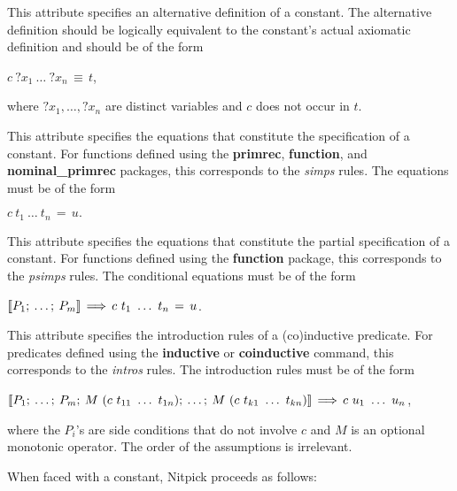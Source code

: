\documentclass[a4paper,12pt]{article}
\begin{document}
\begin{itemize}

\nopagebreak
This attribute specifies an alternative definition of a constant. The
alternative definition should be logically equivalent to the constant's actual
axiomatic definition and should be of the form

\qquad $c~{?}x_1~\ldots~{?}x_n \,\equiv\, t$,

where ${?}x_1, \ldots, {?}x_n$ are distinct variables and $c$ does not occur in
$t$.


\nopagebreak
This attribute specifies the equations that constitute the specification of a
constant. For functions defined using the \textbf{primrec}, \textbf{function},
and \textbf{nominal\_\allowbreak primrec} packages, this corresponds to the
\textit{simps} rules. The equations must be of the form

\qquad $c~t_1~\ldots\ t_n \,=\, u.$


\nopagebreak
This attribute specifies the equations that constitute the partial specification
of a constant. For functions defined using the \textbf{function} package, this
corresponds to the \textit{psimps} rules. The conditional equations must be of
the form

\qquad $\mathopen{[\![} P_1;\> \ldots;\> P_m\mathclose{]\!]} \,\Longrightarrow\, c\ t_1\ \ldots\ t_n \,=\, u$.


\nopagebreak
This attribute specifies the introduction rules of a (co)in\-duc\-tive predicate.
For predicates defined using the \textbf{inductive} or \textbf{coinductive}
command, this corresponds to the \textit{intros} rules. The introduction rules
must be of the form

\qquad $\lbrakk P_1;\> \ldots;\> P_m;\> M~(c\ t_{11}\ \ldots\ t_{1n});\>
\ldots;\> M~(c\ t_{k1}\ \ldots\ t_{kn})\rbrakk \,\Longrightarrow\, c\ u_1\
\ldots\ u_n$,

where the $P_i$'s are side conditions that do not involve $c$ and $M$ is an
optional monotonic operator. The order of the assumptions is irrelevant.

\end{itemize}

When faced with a constant, Nitpick proceeds as follows:
\end{document}
